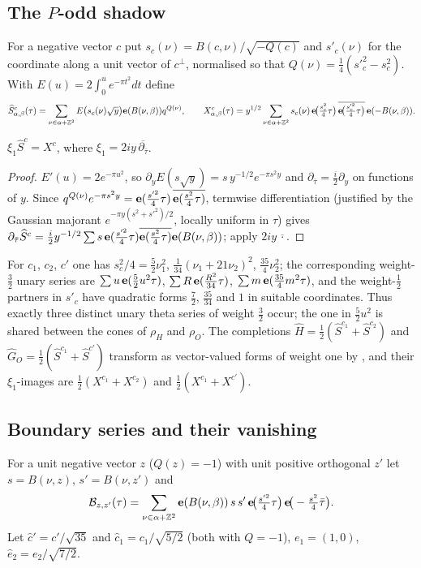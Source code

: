 \subsection{The $P$-odd shadow}
For a negative vector $c$ put $s_c(\nu)=B(c,\nu)/\sqrt{-Q(c)}$ and $s'_c(\nu)$ for the coordinate along a unit vector of $c^\perp$, normalised so that $Q(\nu)=\frac14(s'^2_c-s^2_c)$.
With $E(u)=2\int_0^ue^{-\pi t^2}dt$ define
\[ \widehat S^{c}_{\alpha,\beta}(\tau)=\sum_{\nu\in\alpha+\mathbb{Z}^2}E\big(s_c(\nu)\sqrt{y}\big)\mathbf{e}(B(\nu,\beta))q^{Q(\nu)},\qquad
X^c_{\alpha,\beta}(\tau)=y^{1/2}\sum_{\nu\in\alpha+\mathbb{Z}^2}s_c(\nu)\,\mathbf{e}\!\big(\tfrac{s_c^2}4\tau\big)\,\overline{\mathbf{e}\!\big(\tfrac{s'^2_c}4\tau\big)}\,\mathbf{e}(-B(\nu,\beta)). \]
\begin{proposition}\label{prop:xi}
$\xi_1\widehat S^c=X^c$, where $\xi_1=2iy\,\overline{\partial_{\bar\tau}}$.
\end{proposition}
\begin{proof}
$E'(u)=2e^{-\pi u^2}$, so $\partial_yE(s\sqrt y)=s\,y^{-1/2}e^{-\pi s^2y}$ and $\partial_{\bar\tau}=\frac i2\partial_y$ on functions of $y$. Since
$q^{Q(\nu)}e^{-\pi s^2y}=\mathbf{e}(\frac{s'^2}4\tau)\,\overline{\mathbf{e}(\frac{s^2}4\tau)}$, termwise differentiation (justified by the Gaussian majorant $e^{-\pi y(s^2+s'^2)/2}$, locally
uniform in $\tau$) gives $\partial_{\bar\tau}\widehat S^c=\frac i2y^{-1/2}\sum s\,\mathbf{e}(\frac{s'^2}4\tau)\overline{\mathbf{e}(\frac{s^2}4\tau)}\mathbf{e}(B(\nu,\beta))$; apply $2iy\,\overline{\cdot}$.
\end{proof}
For $c_1$, $c_2$, $c'$ one has $s_c^2/4=\frac52\nu_1^2$, $\frac1{34}(\nu_1+21\nu_2)^2$, $\frac{35}4\nu_2^2$; the corresponding weight-$\frac32$ unary series are
$\sum u\,\mathbf{e}(\frac52u^2\tau)$, $\sum R\,\mathbf{e}(\frac{R^2}{34}\tau)$, $\sum m\,\mathbf{e}(\frac{35}{4}m^2\tau)$, and the weight-$\frac12$ partners in $s'_c$ have quadratic forms $\frac72$,
$\frac{35}{34}$ and $1$ in suitable coordinates. Thus exactly three distinct unary theta series of weight $\frac32$ occur; the one in $\frac52u^2$ is shared between the cones
of $\rho_H$ and $\rho_O$. The completions $\widehat H=\frac12(\widehat S^{c_1}+\widehat S^{c_2})$ and $\widehat G_O=\frac12(\widehat S^{c_1}+\widehat S^{c'})$ transform as
vector-valued forms of weight one by \cite[Cor.~2.9]{Zw}, and their $\xi_1$-images are $\frac12(X^{c_1}+X^{c_2})$ and $\frac12(X^{c_1}+X^{c'})$.

\subsection{Boundary series and their vanishing}
For a unit negative vector $z$ ($Q(z)=-1$) with unit positive orthogonal $z'$ let $s=B(\nu,z)$, $s'=B(\nu,z')$ and
\[ \mathcal B_{z,z'}(\tau)=\sum_{\nu\in\alpha+\mathbb{Z}^2}\mathbf{e}(B(\nu,\beta))\,s\,s'\,\mathbf{e}\!\big(\tfrac{s'^2}4\tau\big)\,\mathbf{e}\!\big(-\tfrac{s^2}4\bar\tau\big). \]
Let $\hat c'=c'/\sqrt{35}$ and $\hat c_1=c_1/\sqrt{5/2}$ (both with $Q=-1$), $e_1=(1,0)$, $\hat e_2=e_2/\sqrt{7/2}$.


